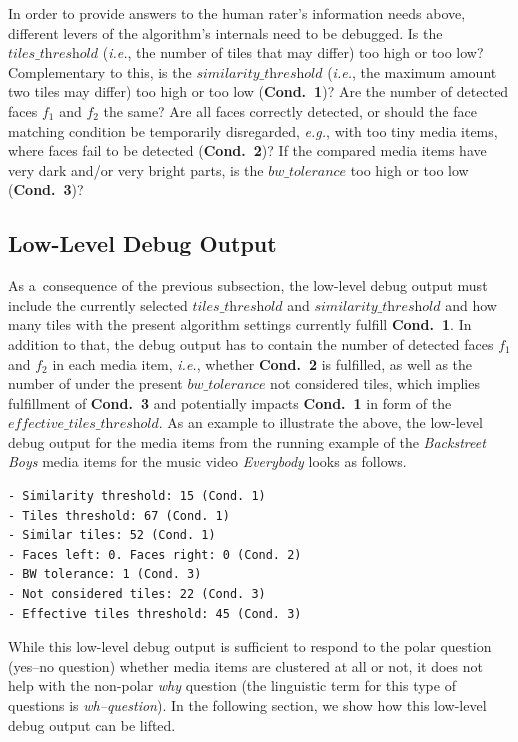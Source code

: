 \documentclass{article}
\begin{document}
In order to provide answers to the human rater's information needs above,
different levers of the algorithm's internals need to be debugged.
Is the $\textit{tiles\_threshold}$
(\emph{i.e.}, the number of tiles that may differ)
too high or too low?
Complementary to this, is the $\textit{similarity\_threshold}$
(\emph{i.e.}, the maximum amount two tiles may differ)
too high or too low (\textbf{Cond.~1})?
Are the number of detected faces $f_1$ and $f_2$ the same?
Are all faces correctly detected,
or should the face matching condition be temporarily disregarded,
\emph{e.g.}, with too tiny media items,
where faces fail to be detected (\textbf{Cond.~2})?
If the compared media items have very dark and/or very bright parts,
is the $\textit{bw\_tolerance}$ too high or too low (\textbf{Cond.~3})?

\subsection{Low-Level Debug Output}
\label{sec:low-level-debug-output}

As a~consequence of the previous subsection,
the low-level debug output must include
the currently selected $\textit{tiles\_threshold}$ and
$\textit{similarity\_threshold}$ and how many tiles
with the present algorithm settings currently fulfill \textbf{Cond.~1}.
In addition to that, the debug output has to contain
the number of detected faces $f_1$ and $f_2$
in each media item, \emph{i.e.}, whether \textbf{Cond.~2} is fulfilled,
as well as the number of under the present $\textit{bw\_tolerance}$
not considered tiles, which implies fulfillment of \textbf{Cond.~3}
and potentially impacts \textbf{Cond.~1}
in form of the $\textit{effective\_tiles\_threshold}$.
As an example to illustrate the above,
the low-level debug output for the media items
from the running example of the \emph{Backstreet Boys} media items
for the music video \emph{Everybody} looks as follows.

\begin{verbatim}
- Similarity threshold: 15 (Cond. 1)
- Tiles threshold: 67 (Cond. 1)
- Similar tiles: 52 (Cond. 1)
- Faces left: 0. Faces right: 0 (Cond. 2)
- BW tolerance: 1 (Cond. 3)
- Not considered tiles: 22 (Cond. 3)
- Effective tiles threshold: 45 (Cond. 3)
\end{verbatim}

While this low-level debug output is sufficient to respond to the polar question
(yes--no question) whether media items are clustered at all or not,
it does not help with the non-polar \emph{why} question
(the linguistic term for this type of questions is \emph{wh--question}).
In the following section, we show how this low-level debug output can be lifted.
\end{document}
